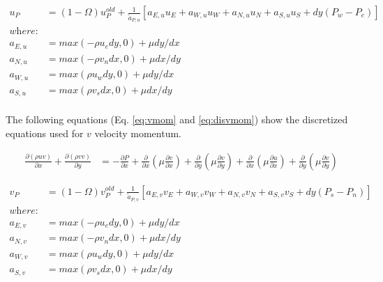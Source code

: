 \documentclass[cleanfoot,cleanhead,onecolumn,12pt,notitlepage]{asme2e}
\begin{document}
\begin{equation}
\begin{aligned}
u_P &= (1 - \Omega) u_P^{old} + \frac{1}{\tilde{a}_{P,u}} 
	\left[a_{E,u} u_E
		+ a_{W,u} u_W
		+ a_{N,u} u_N
		+ a_{S,u} u_S
		+ dy (P_w - P_e)
	\right] \\
	\textit{where:} \\
	a_{E,u} &= max(-\rho u_e dy,0) + \mu dy / dx \\
	a_{N,u} &= max(-\rho v_n dx,0) + \mu dx / dy \\
	a_{W,u} &= max( \rho u_w dy,0) + \mu dy / dx \\
	a_{S,u} &= max( \rho v_s dx,0) + \mu dx / dy \\
\label{eq:disumom}
\end{aligned}
\end{equation}

The following equations (Eq. \ref{eq:vmom} and \ref{eq:disvmom}) show the discretized equations used for $v$ velocity momentum.  

\begin{equation}
\begin{aligned}
\frac{\partial (\rho u v)}{\partial x} + \frac{\partial (\rho v v)}{\partial y} &=
-\frac{\partial P}{\partial x} 
+ \frac{\partial }{\partial x} \left( \mu \frac{\partial v}{\partial x} \right)
+ \frac{\partial }{\partial y} \left( \mu \frac{\partial v}{\partial y} \right)
+ \frac{\partial }{\partial x} \left( \mu \frac{\partial u}{\partial x} \right)
+ \frac{\partial }{\partial y} \left( \mu \frac{\partial v}{\partial y} \right)
\label{eq:vmom}
\end{aligned}
\end{equation}

\begin{equation}
\begin{aligned}
v_P &= (1 - \Omega) v_P^{old} + \frac{1}{\tilde{a}_{P,v}} 
	\left[a_{E,v} v_E
		+ a_{W,v} v_W
		+ a_{N,v} v_N
		+ a_{S,v} v_S
		+ dy (P_s - P_n)
	\right] \\
	\textit{where:} \\
	a_{E,v} &= max(-\rho u_e dy,0) + \mu dy / dx \\
	a_{N,v} &= max(-\rho v_n dx,0) + \mu dx / dy \\
	a_{W,v} &= max( \rho u_w dy,0) + \mu dy / dx \\
	a_{S,v} &= max( \rho v_s dx,0) + \mu dx / dy \\
\label{eq:disvmom}
\end{aligned}
\end{equation}
\end{document}
